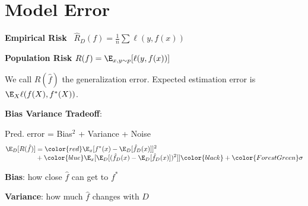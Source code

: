 \section*{Model Error }

\textbf{Empirical Risk} \quad \ $\hat R_D(f) = \frac{1}{n} \sum \mathcal \ell(y, f(x))$

\textbf{Population Risk} \quad $R(f) = \E_{x,y \sim p}[\ell(y, f(x))]$

We call $R(\hat f)$ the generalization error. Expected estimation error is $\E_{X}\ell(f(X), f^\ast(X))$.

\textbf{Bias Variance Tradeoff}:

Pred. error = \color{red} Bias$^2$ \color{black} + \color{blue} Variance \color{black} + \color{ForestGreen} Noise \color{black}
\begin{align*}
	\E_D[R(\hat f)] &= \color{red} \E_x[f^*(x) - \E_D[\hat f_D(x)]]^2 \\[-4pt]
 	&+ \color{blue} \E_x[\E_D[(\hat f_D(x) - \E_D[\hat f_D(x)])^2]] \color{black}  + \color{ForestGreen} \sigma
\end{align*}

\textbf{Bias}: how close $\hat f$ can get to $f^*$

\textbf{Variance}: how much $\hat f$ changes with $D$
